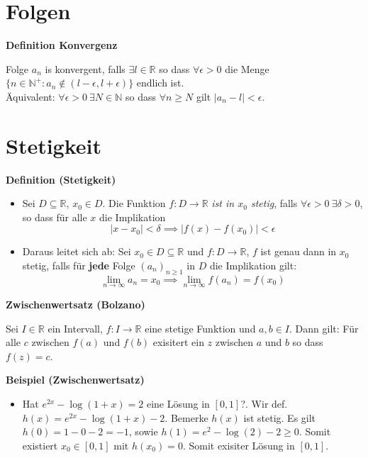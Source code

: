 \documentclass[25pt]{sciposter}
\newcommand{\limm}{\lim\limits_{n \to \infty}}
\newcommand{\R}{\mathbb{R}}
\newcommand{\N}{\mathbb{N}}
\newenvironment{method}[1]{\begin{mdframed}[backgroundcolor=blue!10,innertopmargin=15pt, innerbottommargin=15pt, nobreak=true]
		\textbf{#1 }
	}
	{ 
	\end{mdframed}
}
\begin{document}
\begin{multicols}{3}

\section*{Folgen}

\begin{method}{Definition Konvergenz}
Folge $a_n$ is konvergent, falls $\exists l \in \mathbb{R}$ so dass $\forall \epsilon > 0$ die Menge $\{n \in \mathbb{N}^+: a_n \not \in (l-\epsilon, l + \epsilon)\}$ endlich ist. \\
Äquivalent: $\forall \epsilon > 0 \ \exists N \in \N $ so dass $ \forall n \geq N$ gilt $|a_n - l|< \epsilon$.
\end{method}



\section{Stetigkeit}
\begin{method}{Definition (Stetigkeit)}
	\begin{itemize}
		\item Sei $D \subseteq \mathbb{R}$, $x_0 \in D$. Die Funktion $f:D \to \R$ \textit{ist in $x_0$ stetig}, falls $\forall \epsilon > 0 \ \exists \delta > 0$, so dass für alle $x$ die Implikation $$|x-x_0| < \delta \implies |f(x) - f(x_0)| < \epsilon$$
		
		\item Daraus leitet sich ab: Sei $x_0 \in D \subseteq \R$ und $f:D \to \R$, $f$ ist genau dann in $x_0$ stetig, falls für \textbf{jede} Folge $(a_n)_{n \geq 1}$ in $D$ die Implikation gilt:$$\lim\limits_{n \to \infty} a_n = x_0 \implies \limm f(a_n) = f(x_0)$$
	\end{itemize}

\end{method}



\begin{method}{ {\Large Zwischenwertsatz (Bolzano)} }
	Sei $I \in \R$ ein Intervall, $f: I \to \R$ eine stetige Funktion und $a,b \in I$. Dann gilt: Für alle $c$ zwischen $f(a)$ und $f(b)$ exisitert ein $z$ zwischen $a$ und $b$ so dass $f(z) = c$.
\end{method}

\textbf{Beispiel (Zwischenwertsatz)}
\begin{itemize}
	\item Hat $e^{2x} - \log (1+x) = 2$ eine Lösung in $[0,1]$?. Wir def. $h(x) = e^{2x} - \log (1+x) -2$. Bemerke $h(x)$ ist stetig. Es gilt $h(0) = 1 - 0 - 2 = -1$, sowie $h(1) = e^2 - \log(2) -2 \geq 0$. Somit existiert $x_0 \in [0,1]$ mit $h(x_0) = 0$. Somit exisiter Lösung in $[0,1]$.
\end{itemize}



\end{multicols}
\end{document}
